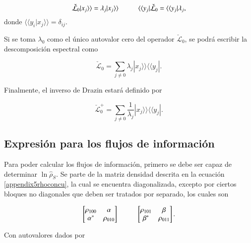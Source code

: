 \begin{appendixs}
\begin{equation*}
    \check{\mathcal{L}}_{0}|x_{j}\rangle \rangle = \lambda_{j} |x_{j}\rangle \rangle \hspace{10mm}  \langle \langle y_{j}|\check{\mathcal{L}}_{0} = \langle \langle y_{j}|\lambda_{j},
\end{equation*}
donde $\langle \langle y_{i}|x_{j}\rangle \rangle = \delta_{ij}$. 

Si se toma $\lambda_{0}$ como el único autovalor cero del operador $\check{\mathcal{L}}_{0}$, se podrá escribir la descomposición espectral como

\begin{equation*}
    \check{\mathcal{L}}_{0} = \sum_{j\neq 0}\lambda_{j}|x_{j}\rangle \rangle \langle \langle y_{j}|.
\end{equation*}

Finalmente, el inverso de Drazin estará definido por 

\begin{equation*}
    \check{\mathcal{L}}^{+}_{0} = \sum_{j\neq 0}\frac{1}{\lambda_{j}}|x_{j}\rangle \rangle \langle \langle y_{j}|.
\end{equation*}

\label{appendix5drazin}

\subsection{Expresión para los flujos de información}
Para poder calcular los flujos de información, primero se debe ser capaz de determinar $\ln \hat{\rho}_{S}$. Se parte de la matriz densidad descrita en la ecuación \ref{appendix5rhoconcu}, la cual se encuentra diagonalizada, excepto por ciertos bloques no diagonales que deben ser tratados por separado, los cuales son 

\begin{equation*}
    \begin{bmatrix}
        \rho_{100} & \alpha \\
        \alpha^{*} & \rho_{010}
    \end{bmatrix}
    \hspace{10mm}
    \begin{bmatrix}
        \rho_{101} & \beta \\
        \beta^{*} & \rho_{011}
    \end{bmatrix}.
\end{equation*}

Con autovalores dados por


\end{appendixs}
